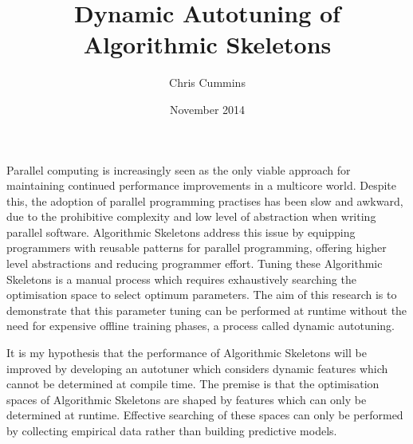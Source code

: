 \title{Dynamic Autotuning of Algorithmic Skeletons}
\author{Chris Cummins}
\date{November 2014}






\maketitle

%
%
%
%
%

Parallel computing is increasingly seen as the only viable approach
for maintaining continued performance improvements in a multicore
world. Despite this, the adoption of parallel programming practises
has been slow and awkward, due to the prohibitive complexity and low
level of abstraction when writing parallel software. Algorithmic
Skeletons address this issue by equipping programmers with reusable
patterns for parallel programming, offering higher level abstractions
and reducing programmer effort. Tuning these Algorithmic Skeletons is
a manual process which requires exhaustively searching the
optimisation space to select optimum parameters. The aim of this
research is to demonstrate that this parameter tuning can be performed
at runtime without the need for expensive offline training phases, a
process called dynamic autotuning.

It is my hypothesis that the performance of Algorithmic Skeletons will
be improved by developing an autotuner which considers dynamic
features which cannot be determined at compile time. The premise is
that the optimisation spaces of Algorithmic Skeletons are shaped by
features which can only be determined at runtime. Effective searching
of these spaces can only be performed by collecting empirical data
rather than building predictive models.

